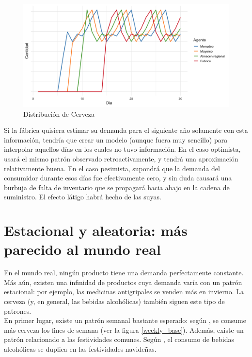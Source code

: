 \begin{figure}[h!]
\caption{Distribuci\'on de Cerveza}
\label{analytic_2}
\includegraphics[width=12cm]{tesis_tex/figs/analytic_solution_0_all_45_inv.png}
\centering
\end{figure}

Si la f\'abrica quisiera estimar su demanda para el siguiente a\~no solamente con esta informaci\'on, tendr\'ia que crear un modelo (aunque fuera muy sencillo) para interpolar aquellos d\'ias en los cuales no tuvo informaci\'on. En el caso optimista, usar\'a el mismo patr\'on observado retroactivamente, y tendr\'a una aproximaci\'on relativamente buena. En el caso pesimista, supondr\'a que la demanda del consumidor durante esos d\'ias fue efectivamente cero, y sin duda causar\'a una burbuja de falta de inventario que se propagar\'a hacia abajo en la cadena de suministro. El efecto l\'atigo habr\'a hecho de las suyas.\\



\section{Estacional y aleatoria: m\'as parecido al mundo real}

En el mundo real, ning\'un producto tiene una demanda perfectamente constante. M\'as a\'un, existen una infinidad de productos cuya demanda var\'ia con un patr\'on estacional: por ejemplo, las medicinas antigripales se venden m\'as en invierno. La cerveza (y, en general, las bebidas alcoh\'olicas) tambi\'en siguen este tipo de patrones.\\

En primer lugar, existe un patr\'on semanal bastante esperado: seg\'un \citet{}, se consume m\'as cerveza los fines de semana (ver la figura \ref{weekly_base}). Adem\'as, existe un patr\'on relacionado a las festividades comunes. Seg\'un \citet{}, el consumo de bebidas alcoh\'olicas se duplica en las festividades navide\~nas. \\


